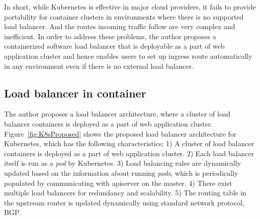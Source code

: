 In short, while Kubernetes is effective in major cloud providers, it fails to provide portability for container clusters in environments where there is no supported load balancer. 
And the routes incoming traffic follow are very complex and inefficient.
In order to address these problems, the author proposes a containerized software load balancer that is deployable as a part of web application cluster and hence enables users to set up ingress route automatically in any environment even if there is no external load balancer.

\FloatBarrier

\subsection{Load balancer in container}\label{Load balancer in container}

The author proposes a load balancer architecture, where a cluster of load balancer containers is deployed as a part of web application cluster.
Figure~\ref{fig:K8sProposed} shows the proposed load balancer architecture for Kubernetes,
which has the following characteristics;
1) A cluster of load balancer containers is deployed as a part of web application cluster.
2) Each load balancer itself is run as a {\em pod} by Kubernetes.
3) Load balancing rules are dynamically updated based on the information about running {\em pods}, which is periodically populated by communicating with apiserver on the master.
4) There exist multiple load balancers for redundancy and scalability.
5) The routing table in the upstream router is updated dynamically using standard network protocol, BGP.

